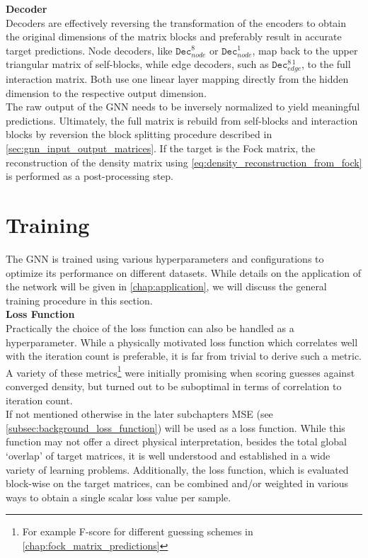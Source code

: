 \textbf{Decoder}\\
Decoders are effectively reversing the transformation of the encoders to obtain the original dimensions of the matrix blocks and preferably result in accurate target predictions. Node decoders, like $\texttt{Dec}^{8}_{node}$ or  $\texttt{Dec}^{1}_{node}$, map back to the upper triangular matrix of self-blocks, while edge decoders, such as $\texttt{Dec}^{8\,1}_{edge}$, to the full interaction matrix. Both use one linear layer mapping directly from the hidden dimension to the respective output dimension. \\

The raw output of the GNN needs to be inversely normalized to yield meaningful predictions. Ultimately, the full matrix is rebuild from self-blocks and interaction blocks by reversion the block splitting procedure described in \autoref{sec:gnn_input_output_matrices}. If the target is the Fock matrix, the reconstruction of the density matrix using \autoref{eq:density_reconstruction_from_fock} is performed as a post-processing step.




\section{Training}
\label{sec:gnn_training}

The GNN is trained using various hyperparameters and configurations to optimize its performance on different datasets. While details on the application of the network will be given in \autoref{chap:application}, we will discuss the general training procedure in this section. \\

\textbf{Loss Function}\\
Practically the choice of the loss function can also be handled as a hyperparameter. While a physically motivated loss function which correlates well with the iteration count is preferable, it is far from trivial to derive such a metric. A variety of these metrics\footnote{For example F-score for different guessing schemes in \autoref{chap:fock_matrix_predictions}} were initially promising when scoring guesses against converged density, but turned out to be suboptimal in terms of correlation to iteration count. \\
If not mentioned otherwise in the later subchapters MSE (see \autoref{subsec:background_loss_function}) will be used as a loss function. While this function may not offer a direct physical interpretation, besides the total global `overlap' of target matrices, it is well understood and established in a wide variety of learning problems. Additionally, the loss function, which is evaluated block-wise on the target matrices, can be combined and/or weighted in various ways to obtain a single scalar loss value per sample.

